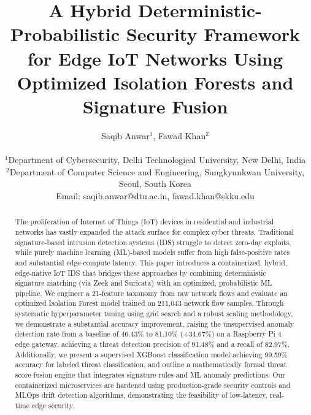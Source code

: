 \documentclass[journal]{IEEEtran}
\begin{document}
\title{A Hybrid Deterministic-Probabilistic Security Framework for Edge IoT Networks Using Optimized Isolation Forests and Signature Fusion}

\author{Saqib Anwar$^{1}$, Fawad Khan$^{2}$ \\
 \\
$^{1}$Department of Cybersecurity, Delhi Technological University, New Delhi, India \\
$^{2}$Department of Computer Science and Engineering, Sungkyunkwan University, Seoul, South Korea \\
Email: saqib.anwar@dtu.ac.in, fawad.khan@skku.edu}

\maketitle

\begin{abstract}
The proliferation of Internet of Things (IoT) devices in residential and industrial networks has vastly expanded the attack surface for complex cyber threats. Traditional signature-based intrusion detection systems (IDS) struggle to detect zero-day exploits, while purely machine learning (ML)-based models suffer from high false-positive rates and substantial edge-compute latency. This paper introduces a containerized, hybrid, edge-native IoT IDS that bridges these approaches by combining deterministic signature matching (via Zeek and Suricata) with an optimized, probabilistic ML pipeline. We engineer a 21-feature taxonomy from raw network flows and evaluate an optimized Isolation Forest model trained on 211,043 network flow samples. Through systematic hyperparameter tuning using grid search and a robust scaling methodology, we demonstrate a substantial accuracy improvement, raising the unsupervised anomaly detection rate from a baseline of 46.43\% to 81.10\% (+34.67\%) on a Raspberry Pi 4 edge gateway, achieving a threat detection precision of 91.48\% and a recall of 82.97\%. Additionally, we present a supervised XGBoost classification model achieving 99.59\% accuracy for labeled threat classification, and outline a mathematically formal threat score fusion engine that integrates signature rules and ML anomaly predictions. Our containerized microservices are hardened using production-grade security controls and MLOps drift detection algorithms, demonstrating the feasibility of low-latency, real-time edge security.
\end{abstract}
\end{document}
